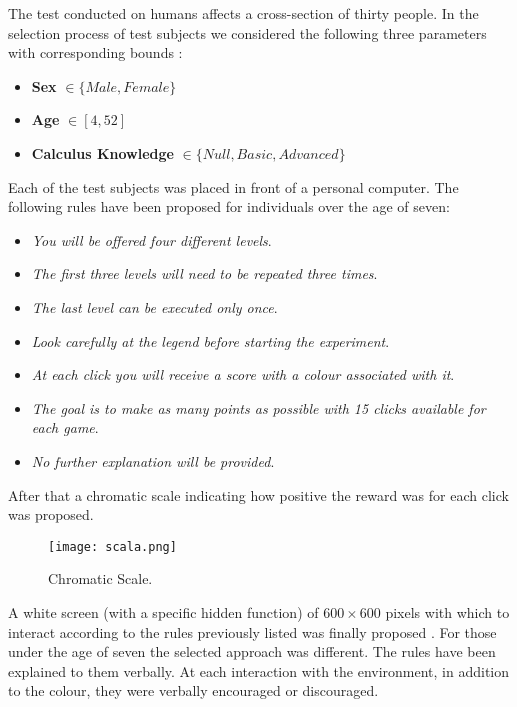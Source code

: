 The test conducted on humans affects a cross-section of thirty people. In the selection process of test subjects we considered the following three parameters with corresponding bounds :

\begin{itemize}
	\item \textbf{Sex} $\in \{Male, Female\}$
	\item \textbf{Age} $\in [4, 52]$
	\item \textbf{Calculus Knowledge} $\in \{Null, Basic, Advanced\}$ 
\end{itemize}  

Each of the test subjects was placed in front of a personal computer. The following rules have been proposed for individuals over the age of seven:

	
\begin{itemize}
	\item \textit{You will be offered four different levels}.
	\item \textit{The first three levels will need to be repeated three times}.
	\item \textit{The last level can be executed only once}.
	\item \textit{Look carefully at the legend before starting the experiment}.
	\item \textit{At each click you will receive a score with a colour associated with it}.
	\item \textit{The goal is to make as many points as possible with 15 clicks available for each game}.
	\item \textit{No further explanation will be provided}.
\end{itemize}


After that a chromatic scale indicating how positive the reward was for each click was proposed.

\begin{figure}[h!]
	\centering
	\texttt{[image: scala.png]}
	\caption{Chromatic Scale.}
	\label{fig:Cromatic Scale}
\end{figure}

A white screen (with a specific hidden function) of $600 \times 600$ pixels with which to interact according to the rules previously listed was finally proposed . For those under the age of seven the selected approach was different. The rules have been explained to them verbally. At each interaction with the environment, in addition to the colour, they were verbally encouraged or discouraged.









